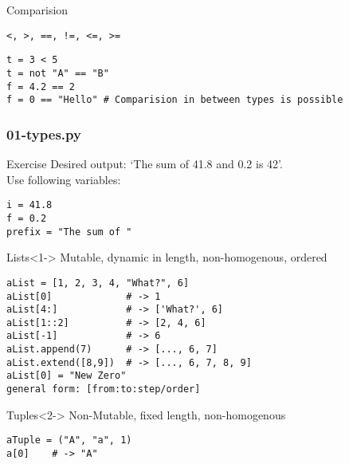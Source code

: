\documentclass{beamer}
\begin{document}
\begin{frame}[fragile]
	\begin{block}{Comparision}
		\begin{verbatim}
<, >, ==, !=, <=, >=
		\end{verbatim}
	\end{block}
	\begin{example}{}
		\begin{verbatim}
t = 3 < 5 
t = not "A" == "B"
f = 4.2 == 2
f = 0 == "Hello" # Comparision in between types is possible
		\end{verbatim}
	\end{example}
\end{frame}

\begin{frame}[fragile]
	\frametitle{01-types.py}
	\begin{exampleblock}{Exercise}
	Desired output: `The sum of 41.8 and 0.2 is 42'.\\
	Use following variables:
		\begin{verbatim}
i = 41.8
f = 0.2
prefix = "The sum of "
		\end{verbatim}
	\end{exampleblock}
\end{frame}

\begin{frame}[fragile]
	\begin{block}{Lists}<1->
Mutable, dynamic in length, non-homogenous, ordered
\begin{verbatim}
aList = [1, 2, 3, 4, "What?", 6]
aList[0]             # -> 1
aList[4:]            # -> ['What?', 6]
aList[1::2]          # -> [2, 4, 6]  
aList[-1]            # -> 6
aList.append(7)      # -> [..., 6, 7]
aList.extend([8,9])  # -> [..., 6, 7, 8, 9]
aList[0] = "New Zero"
general form: [from:to:step/order]
\end{verbatim}
	\end{block}
	\begin{block}{Tuples}<2->
	Non-Mutable, fixed length, non-homogenous
	\begin{verbatim}
aTuple = ("A", "a", 1)
a[0] 	# -> "A"
	\end{verbatim}
\end{block}
\end{frame}
\end{document}

